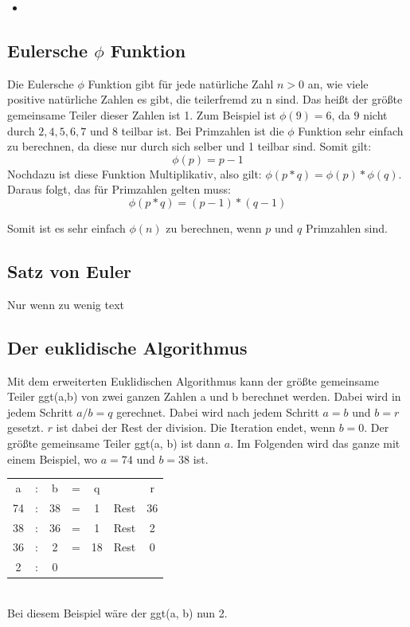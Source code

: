 \documentclass[12pt,a4paper]{scrartcl}
\begin{document}
	\begin{itemize}
	\item
	
	\end{itemize}
	
	\label{ch:einweg}
	\subsection{Eulersche $\phi$ Funktion}
	\label{cha:phi}
	
	Die Eulersche $\phi$ Funktion gibt für jede natürliche Zahl ${n > 0}$ an, wie viele positive natürliche Zahlen es gibt, die teilerfremd zu n sind. Das heißt der größte gemeinsame Teiler dieser Zahlen ist 1. Zum Beispiel ist ${\phi(9) = 6}$, da ${9}$ nicht durch ${2, 4, 5, 6, 7 }$ und $8$ teilbar ist. Bei Primzahlen ist die $\phi$ Funktion sehr einfach zu berechnen, da diese nur durch sich selber und 1 teilbar sind. Somit gilt: $${\phi(p) = p - 1}$$
	Nochdazu ist diese Funktion Multiplikativ, also gilt: ${\phi(p * q) = \phi(p) * \phi(q)}$.
	Daraus folgt, das für Primzahlen gelten muss:
	$${\phi(p * q) = (p - 1) * (q - 1)}$$
	
	Somit ist es sehr einfach $\phi(n)$ zu berechnen, wenn $p$ und $q$ Primzahlen sind.
	\subsection{Satz von Euler}
	Nur wenn zu wenig text
	
	\subsection{Der euklidische Algorithmus}
	 Mit dem erweiterten Euklidischen Algorithmus kann der größte gemeinsame Teiler ggt(a,b) von zwei ganzen Zahlen a und b berechnet werden.
	 Dabei wird in jedem Schritt $a / b = q$ gerechnet. Dabei wird nach jedem Schritt $a=b$ und $b = r$ gesetzt. $r$ ist dabei der Rest der division. Die Iteration endet, wenn $b=0$. Der größte gemeinsame Teiler ggt(a, b) ist dann $a$. Im Folgenden wird das ganze mit einem Beispiel, wo $a = 74$ und $b = 38$ ist. \\
	 \begin{tabular}{ c c c c c c c}
 		a & : & b & = & q & & r \\ 
 		74 & : & 38 & = & 1 & Rest & 36\\ 
 		38 & : & 36 & = & 1 & Rest & 2\\ 
 		36 & : & 2 & = & 18 & Rest & 0\\
 		2 & : & 0 & \\
	\end{tabular}\\
	Bei diesem Beispiel wäre der ggt(a, b) nun 2.
\end{document}
